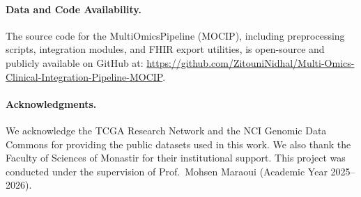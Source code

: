 \documentclass[12pt,a4paper,onecolumn]{article}
\begin{document}
\paragraph{Data and Code Availability.}
{
The source code for the MultiOmicsPipeline (MOCIP), including preprocessing scripts, integration modules, and FHIR export utilities, is open-source and publicly available on GitHub at: \url{https://github.com/ZitouniNidhal/Multi-Omics-Clinical-Integration-Pipeline-MOCIP}.
}

\paragraph{Acknowledgments.}
\noindent We acknowledge the TCGA Research Network and the NCI Genomic Data Commons for providing the public datasets used in this work. We also thank the Faculty of Sciences of Monastir for their institutional support. This project was conducted under the supervision of Prof.\ Mohsen Maraoui (Academic Year 2025--2026).

\label{page:before_refs}

\printbibliography
\end{document}
